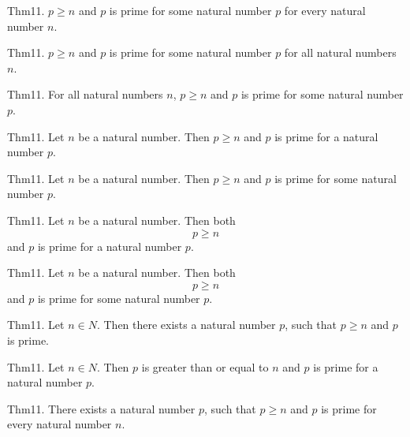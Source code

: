\documentclass{article}
\begin{document}
Thm11. $p \geq n$ and $p$ is prime for some natural number $p$ for every natural number $n$.

Thm11. $p \geq n$ and $p$ is prime for some natural number $p$ for all natural numbers $n$.

Thm11. For all natural numbers $n$, $p \geq n$ and $p$ is prime for some natural number $p$.

Thm11. Let $n$ be a natural number. Then $p \geq n$ and $p$ is prime for a natural number $p$.

Thm11. Let $n$ be a natural number. Then $p \geq n$ and $p$ is prime for some natural number $p$.

Thm11. Let $n$ be a natural number. Then both $$p \geq n$$ and $p$ is prime for a natural number $p$.

Thm11. Let $n$ be a natural number. Then both $$p \geq n$$ and $p$ is prime for some natural number $p$.

Thm11. Let $n \in N$. Then there exists a natural number $p$, such that $p \geq n$ and $p$ is prime.

Thm11. Let $n \in N$. Then $p$ is greater than or equal to $n$ and $p$ is prime for a natural number $p$.

Thm11. There exists a natural number $p$, such that $p \geq n$ and $p$ is prime for every natural number $n$.
\end{document}
